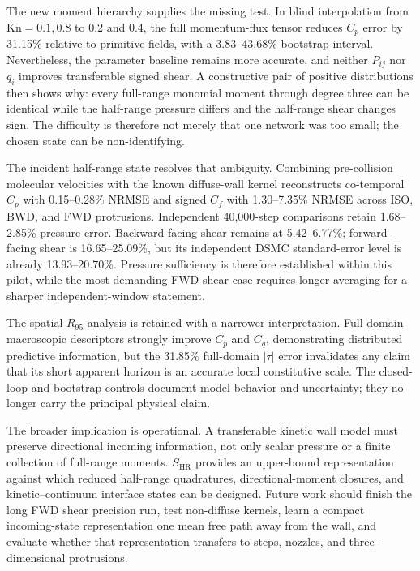 \documentclass[aip,pof,preprint,floatfix,amsmath,amssymb]{revtex4-2}
\newcommand{\Kn}{\mathrm{Kn}}
\begin{document}
The new moment hierarchy supplies the missing test. In blind interpolation from $\Kn=0.1,0.8$ to 0.2 and 0.4, the full momentum-flux tensor reduces $C_p$ error by 31.15\% relative to primitive fields, with a 3.83--43.68\% bootstrap interval. Nevertheless, the parameter baseline remains more accurate, and neither $P_{ij}$ nor $q_i$ improves transferable signed shear. A constructive pair of positive distributions then shows why: every full-range monomial moment through degree three can be identical while the half-range pressure differs and the half-range shear changes sign. The difficulty is therefore not merely that one network was too small; the chosen state can be non-identifying.

The incident half-range state resolves that ambiguity. Combining pre-collision molecular velocities with the known diffuse-wall kernel reconstructs co-temporal $C_p$ with 0.15--0.28\% NRMSE and signed $C_f$ with 1.30--7.35\% NRMSE across ISO, BWD, and FWD protrusions. Independent 40,000-step comparisons retain 1.68--2.85\% pressure error. Backward-facing shear remains at 5.42--6.77\%; forward-facing shear is 16.65--25.09\%, but its independent DSMC standard-error level is already 13.93--20.70\%. Pressure sufficiency is therefore established within this pilot, while the most demanding FWD shear case requires longer averaging for a sharper independent-window statement.

The spatial $R_{95}$ analysis is retained with a narrower interpretation. Full-domain macroscopic descriptors strongly improve $C_p$ and $C_q$, demonstrating distributed predictive information, but the 31.85\% full-domain $|\tau|$ error invalidates any claim that its short apparent horizon is an accurate local constitutive scale. The closed-loop and bootstrap controls document model behavior and uncertainty; they no longer carry the principal physical claim.

The broader implication is operational. A transferable kinetic wall model must preserve directional incoming information, not only scalar pressure or a finite collection of full-range moments. $S_{\mathrm{HR}}$ provides an upper-bound representation against which reduced half-range quadratures, directional-moment closures, and kinetic--continuum interface states can be designed. Future work should finish the long FWD shear precision run, test non-diffuse kernels, learn a compact incoming-state representation one mean free path away from the wall, and evaluate whether that representation transfers to steps, nozzles, and three-dimensional protrusions.
\end{document}
